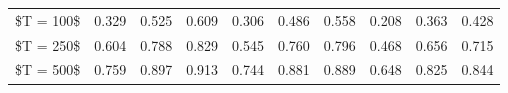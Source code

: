 % 
\begin{tabular}{cccccccccc}
  \hline
  \hline
\$T = 100\$ & 0.329 & 0.525 & 0.609 & 0.306 & 0.486 & 0.558 & 0.208 & 0.363 & 0.428 \\ 
  \$T = 250\$ & 0.604 & 0.788 & 0.829 & 0.545 & 0.760 & 0.796 & 0.468 & 0.656 & 0.715 \\ 
  \$T = 500\$ & 0.759 & 0.897 & 0.913 & 0.744 & 0.881 & 0.889 & 0.648 & 0.825 & 0.844 \\ 
   \hline
\end{tabular}
